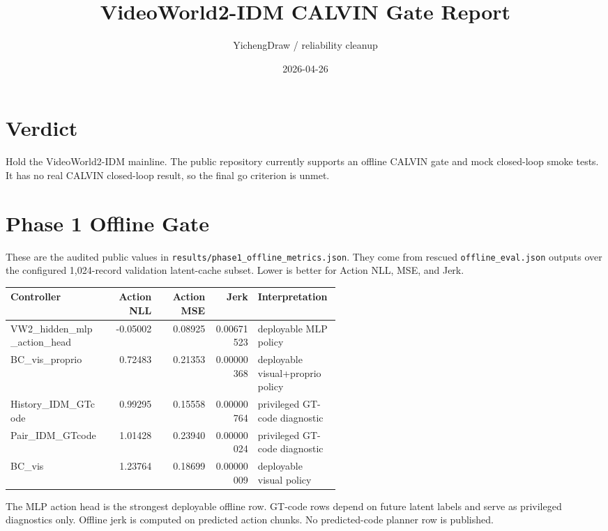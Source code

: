\documentclass[11pt]{article}
\title{VideoWorld2-IDM CALVIN Gate Report}
\author{YichengDraw / reliability cleanup}
\date{2026-04-26}
\begin{document}
\maketitle

\section*{Verdict}

Hold the VideoWorld2-IDM mainline. The public repository currently supports an offline CALVIN gate and mock closed-loop smoke tests. It has no real CALVIN closed-loop result, so the final go criterion is unmet.

\section*{Phase 1 Offline Gate}

These are the audited public values in \texttt{results/phase1\_offline\_metrics.json}. They come from rescued \texttt{offline\_eval.json} outputs over the configured 1,024-record validation latent-cache subset. Lower is better for Action NLL, MSE, and Jerk.

\begin{center}
\begingroup
\small
\setlength{\tabcolsep}{4pt}
\begin{tabular}{>{\raggedright\arraybackslash}p{0.30\linewidth}rrr>{\raggedright\arraybackslash}p{0.25\linewidth}}
\hline
Controller & Action NLL & Action MSE & Jerk & Interpretation \\
\hline
VW2\_hidden\_mlp\_action\_head & -0.05002 & 0.08925 & 0.00671523 & deployable MLP policy \\
BC\_vis\_proprio & 0.72483 & 0.21353 & 0.00000368 & deployable visual+proprio policy \\
History\_IDM\_GTcode & 0.99295 & 0.15558 & 0.00000764 & privileged GT-code diagnostic \\
Pair\_IDM\_GTcode & 1.01428 & 0.23940 & 0.00000024 & privileged GT-code diagnostic \\
BC\_vis & 1.23764 & 0.18699 & 0.00000009 & deployable visual policy \\
\hline
\end{tabular}
\endgroup
\end{center}

The MLP action head is the strongest deployable offline row. GT-code rows depend on future latent labels and serve as privileged diagnostics only. Offline jerk is computed on predicted action chunks. No predicted-code planner row is published.
\end{document}

